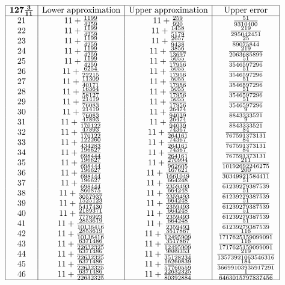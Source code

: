 \documentclass{amsart}
\begin{document}
$$\begin{array}{|c|c|c|c|} 
\hline
 {\bf 127\frac{3}{11}}&\text{Lower approximation}&\text{Upper approximation}&\text{Upper error}\\
 \hline
21&11+\frac{1199}{4259}&11+\frac{259}{920}&\frac{51}{9310400}\\
22&11+\frac{1199}{4259}&11+\frac{1458}{5179}&\frac{219}{295042451}\\
23&11+\frac{1199}{4259}&11+\frac{2657}{9438}&\frac{25}{89075844}\\
24&11+\frac{1199}{4259}&11+\frac{3856}{13697}&\frac{219}{2063685899}\\
25&11+\frac{1199}{4259}&11+\frac{5055}{17956}&\frac{51}{3546597296}\\
26&11+\frac{6254}{22215}&11+\frac{5055}{17956}&\frac{51}{3546597296}\\
27&11+\frac{11309}{40171}&11+\frac{5055}{17956}&\frac{51}{3546597296}\\
28&11+\frac{16364}{58127}&11+\frac{5055}{17956}&\frac{51}{3546597296}\\
29&11+\frac{21419}{76083}&11+\frac{5055}{17956}&\frac{51}{3546597296}\\
30&11+\frac{21419}{76083}&11+\frac{26474}{94039}&\frac{9}{8843333521}\\
31&11+\frac{47893}{170122}&11+\frac{26474}{94039}&\frac{9}{8843333521}\\
32&11+\frac{47893}{170122}&11+\frac{74367}{264161}&\frac{84}{767591373131}\\
33&11+\frac{122260}{434283}&11+\frac{74367}{264161}&\frac{84}{767591373131}\\
34&11+\frac{196627}{698444}&11+\frac{74367}{264161}&\frac{84}{767591373131}\\
35&11+\frac{196627}{698444}&11+\frac{270994}{962605}&\frac{211}{10192692246275}\\
36&11+\frac{196627}{698444}&11+\frac{467621}{1661049}&\frac{200}{30349921584411}\\
37&11+\frac{196627}{698444}&11+\frac{664248}{2359493}&\frac{51}{61239279387539}\\
38&11+\frac{860875}{3057937}&11+\frac{664248}{2359493}&\frac{51}{61239279387539}\\
39&11+\frac{1525123}{5417430}&11+\frac{664248}{2359493}&\frac{51}{61239279387539}\\
40&11+\frac{2189371}{7776923}&11+\frac{664248}{2359493}&\frac{51}{61239279387539}\\
41&11+\frac{2853619}{10136416}&11+\frac{664248}{2359493}&\frac{51}{61239279387539}\\
42&11+\frac{2853619}{10136416}&11+\frac{3517867}{12495909}&\frac{116}{1717625159099091}\\
43&11+\frac{6371486}{22632325}&11+\frac{3517867}{12495909}&\frac{116}{1717625159099091}\\
44&11+\frac{6371486}{22632325}&11+\frac{9889353}{35128234}&\frac{219}{13573921063546316}\\
45&11+\frac{6371486}{22632325}&11+\frac{16260839}{57760559}&\frac{184}{36699103935917291}\\
46&11+\frac{6371486}{22632325}&11+\frac{22632325}{80392884}&\frac{1}{6463015797837456}\\
 \hline
\end{array}$$
\end{document}
